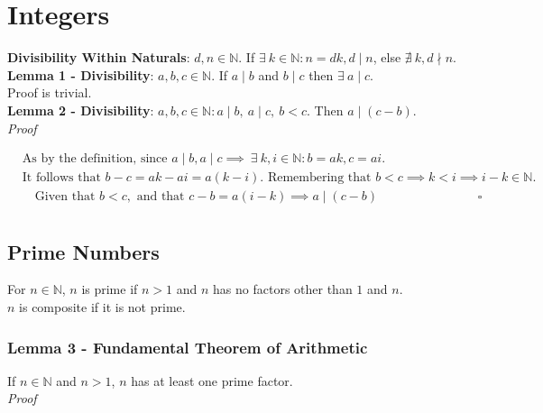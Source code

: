 \documentclass{article}
\begin{document}
    \section{Integers}
        \textbf{Divisibility Within Naturals}: $d,n\in \mathbb{N}$. If $\exists~ k\in \mathbb{N}: n = dk, d\mid n$, else $\nexists~ k, d \nmid n$.\\

        \textbf{Lemma 1 - Divisibility}: $a,b,c\in \mathbb{N}$. If $a\mid b$ and $b\mid c$ then $\exists~ a\mid c$.\\

            Proof is trivial.\\

        \textbf{Lemma 2 - Divisibility}: $a,b,c\in \mathbb{N} : a\mid b,~ a\mid c,~ b<c$. Then $a\mid (c-b)$.\\

            \textit{Proof}

            \begin{align*}
                &\text{As by the definition, since }a\mid b, a\mid c\implies ~\exists~k,i\in \mathbb{N}: b = ak, c = ai.\\
                &\text{It follows that }b - c = ak - ai = a(k - i).\text{ Remembering that } b < c \implies k < i \implies i-k\in \mathbb{N}.\\
                &\quad\text{Given that } b < c,\text{ and that } c-b = a(i-k) \implies a\mid (c-b)&\square\\
            \end{align*}

        \subsection{Prime Numbers}
            For $n\in \mathbb{N}$, $n$ is prime if $n>1$ and $n$ has no factors other than $1$ and $n$.\\

            $n$ is composite if it is not prime.\\

            \subsubsection{Lemma 3 - Fundamental Theorem of Arithmetic}
                If $n \in \mathbb{N}$ and $n>1$, $n$ has at least one prime factor.\\

                \textit{Proof}
\end{document}
